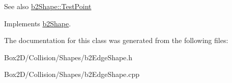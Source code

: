 \begin{DoxySeeAlso}{See also}
\hyperlink{classb2_shape_a6ac968e403e2d93e8ae46d728a2e50fa}{b2\+Shape\+::\+Test\+Point} 
\end{DoxySeeAlso}


Implements \hyperlink{classb2_shape_a6ac968e403e2d93e8ae46d728a2e50fa}{b2\+Shape}.



The documentation for this class was generated from the following files\+:\begin{DoxyCompactItemize}
\item 
Box2\+D/\+Collision/\+Shapes/b2\+Edge\+Shape.\+h\item 
Box2\+D/\+Collision/\+Shapes/b2\+Edge\+Shape.\+cpp\end{DoxyCompactItemize}
